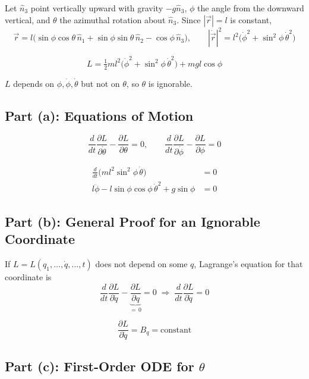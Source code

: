 \documentclass[11pt]{article}
\begin{document}
Let $\hat n_3$ point vertically upward with gravity $-g\hat n_3$, $\phi$ the angle from the downward vertical, and $\theta$ the azimuthal rotation about $\hat n_3$. Since $|\vec r|=l$ is constant,
\[
    \vec r = l\big(\sin\phi\cos\theta\,\hat n_1+\sin\phi\sin\theta\,\hat n_2-\cos\phi\,\hat n_3\big),
    \qquad
    |\dot{\vec r}|^2 = l^2\big(\dot\phi^2+\sin^2\phi\,\dot\theta^2\big)
\]
\begin{result}
\[
    L = \tfrac12 ml^2\big(\dot\phi^2+\sin^2\phi\,\dot\theta^2\big) + mgl\cos\phi
\]
\end{result}
$L$ depends on $\phi,\dot\phi,\dot\theta$ but not on $\theta$, so $\theta$ is ignorable.

\subsection*{Part (a): Equations of Motion}

\[
    \frac{d}{dt}\frac{\partial L}{\partial\dot\theta}-\frac{\partial L}{\partial\theta}=0,
    \qquad
    \frac{d}{dt}\frac{\partial L}{\partial\dot\phi}-\frac{\partial L}{\partial\phi}=0
\]
\begin{result}
\begin{align*}
    \frac{d}{dt}\Big(ml^2\sin^2\phi\,\dot\theta\Big) &= 0\\
    l\ddot\phi - l\sin\phi\cos\phi\,\dot\theta^2 + g\sin\phi &= 0
\end{align*}
\end{result}

\subsection*{Part (b): General Proof for an Ignorable Coordinate}

If $L=L(q_1,\dots,\dot q,\dots,t)$ does not depend on some $q$, Lagrange's equation for that coordinate is
\[
    \frac{d}{dt}\frac{\partial L}{\partial\dot q}-\underbrace{\frac{\partial L}{\partial q}}_{=\,0}=0
    \;\Longrightarrow\;
    \frac{d}{dt}\frac{\partial L}{\partial\dot q}=0
\]
\begin{result}
\[
    \frac{\partial L}{\partial\dot q} = B_q = \text{constant}
\]
\end{result}

\subsection*{Part (c): First-Order ODE for $\theta$}
\end{document}

